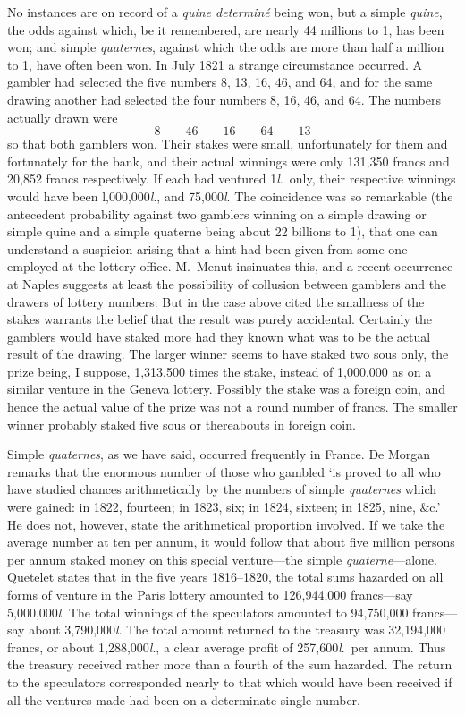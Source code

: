 \documentclass[letterpaper,12pt,oneside,openany]{memoir}
\begin{document}
No instances are on record of a \textit{quine determin\'e} being
won, but a simple \textit{quine}, the odds against which, be it
remembered, are nearly 44 millions to 1, has been won;
and simple \textit{quaternes}, against which the odds are more
than half a million to 1, have often been won. In
July 1821 a strange circumstance occurred. A gambler
had selected the five numbers 8, 13, 16, 46, and 64,
and for the same drawing another had selected the four
numbers 8, 16, 46, and 64. The numbers actually
drawn were
\[
8 \qquad 46 \qquad 16 \qquad 64 \qquad 13
\]
so that both gamblers won. Their stakes were small,
unfortunately for them and fortunately for the bank,
and their actual winnings were only 131,350 francs and
20,852 francs respectively. If each had ventured 1\textit{l}.\ only,
their respective winnings would have been
l,000,000\textit{l}., and 75,000\textit{l}. The coincidence was so remarkable
(the antecedent probability against two gamblers
winning on a simple drawing or simple quine and a
simple quaterne being about 22 billions to 1), that one
can understand a suspicion arising that a hint had been
given from some one employed at the lottery-office.
M.~Menut insinuates this, and a recent occurrence at
Naples suggests at least the possibility of collusion between
gamblers and the drawers of lottery numbers.
But in the case above cited the smallness of the stakes
warrants the belief that the result was purely accidental.
Certainly the gamblers would have staked more had
they known what was to be the actual result of the
drawing. The larger winner seems to have staked two
sous only, the prize being, I suppose, 1,313,500 times
the stake, instead of 1,000,000 as on a similar venture
in the Geneva lottery. Possibly the stake was a foreign
coin, and hence the actual value of the prize was not a
round number of francs. The smaller winner probably
staked five sous or thereabouts in foreign coin.

Simple \textit{quaternes}, as we have said, occurred frequently
in France. De Morgan remarks that the
enormous number of those who gambled `is proved
to all who have studied chances arithmetically by the
numbers of simple \textit{quaternes} which were gained: in
1822, fourteen; in 1823, six; in 1824, sixteen; in
1825, nine, \&c.' He does not, however, state the
arithmetical proportion involved. If we take the
average number at ten per annum, it would follow that
about five million persons per annum staked money
on this special venture---the simple \textit{quaterne}---alone.
Quetelet states that in the five years 1816--1820, the
total sums hazarded on all forms of venture in the
Paris lottery amounted to 126,944,000 francs---say
5,000,000\textit{l}. The total winnings of the speculators
amounted to 94,750,000 francs---say about 3,790,000\textit{l}.
The total amount returned to the treasury was 32,194,000
francs, or about 1,288,000\textit{l}., a clear average profit of
257,600\textit{l}.\ per annum. Thus the treasury received
rather more than a fourth of the sum hazarded. The
return to the speculators corresponded nearly to that
which would have been received if all the ventures made
had been on a determinate single number.
\end{document}
